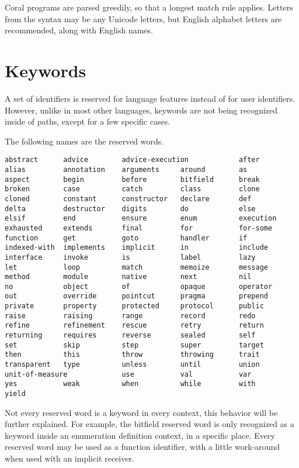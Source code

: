 Coral programs are parsed greedily, so that a longest match rule applies. Letters from the syntax may be any Unicode letters, but English alphabet letters are recommended, along with English names.

\section{Keywords}\label{sec:keywords}
A set of identifiers is reserved for language features instead of for user identifiers. However, unlike in most other languages, keywords are not being recognized inside of paths, except for a few specific cases.

The following names are the reserved words.

\begin{lstlisting}
abstract      advice        advice-execution            after
alias         annotation    arguments     around        as
aspect        begin         before        bitfield      break
broken        case          catch         class         clone
cloned        constant      constructor   declare       def
delta         destructor    digits        do            else
elsif         end           ensure        enum          execution
exhausted     extends       final         for           for-some
function      get           goto          handler       if
indexed-with  implements    implicit      in            include
interface     invoke        is            label         lazy
let           loop          match         memoize       message
method        module        native        next          nil
no            object        of            opaque        operator
out           override      pointcut      pragma        prepend
private       property      protected     protocol      public
raise         raising       range         record        redo
refine        refinement    rescue        retry         return
returning     requires      reverse       sealed        self
set           skip          step          super         target
then          this          throw         throwing      trait
transparent   type          unless        until         union
unit-of-measure             use           val           var
yes           weak          when          while         with
yield
\end{lstlisting}

Not every reserved word is a keyword in every context, this behavior will be further explained. For example, the bitfield reserved word is only recognized as a keyword inside an enumeration definition context, in a specific place. Every reserved word may be used as a function identifier, with a little work-around when used with an implicit receiver.

